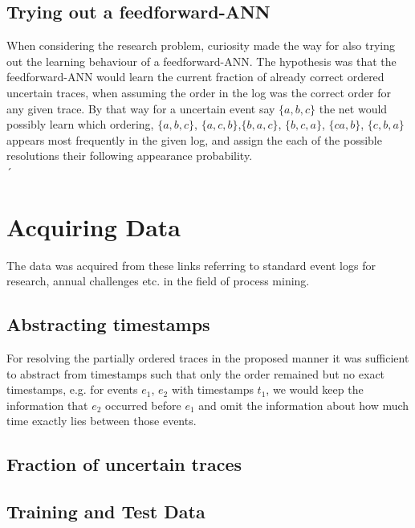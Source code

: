 \documentclass[
	a4paper,
	pagesize,
	pdftex,
	12pt,
	ngerman,
	fleqn,
	final,
	]{scrartcl}
\theoremstyle{plain}
\theoremstyle{definition}
\begin{document}
	
	\subsection{Trying out a feedforward-ANN}
	When considering the research problem, curiosity made the way for also trying out the learning behaviour of a feedforward-ANN. 
	The hypothesis was that the feedforward-ANN would learn the current fraction of already correct ordered uncertain traces, when assuming the order in the log was the correct order for any given trace. By that way for a uncertain event say \(\{a, b, c\}\) the net would possibly learn which ordering, \(\{a, b, c\}\),  \(\{a, c, b\}\),\(\{b, a, c\}\), \(\{b, c, a\}\), \(\{c a, b\}\), \(\{c, b, a\}\) appears most frequently in the given log, and assign the each of the possible resolutions their following appearance probability. \\
	´

\section{Acquiring Data}
	The data was acquired from these links referring to standard event logs for research, annual challenges etc. in the field of process mining.
	
	\subsection{Abstracting timestamps}
	For resolving the partially ordered traces in the proposed manner it was sufficient to abstract from timestamps such that only the order remained but no exact timestamps, e.g. for events \textit{$e_1$}, \textit{$e_2$} with timestamps \textit{$t_1$},  we would keep the information that \textit{$e_2$} occurred before \textit{$e_1$} and omit the information about how much time exactly lies between those events.
	
	\subsection{Fraction of uncertain traces}
	
	\subsection{Training and Test Data}
	
\end{document}
